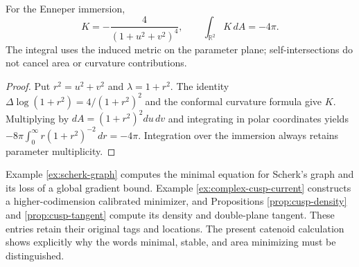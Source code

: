 \begin{proposition}\label{prop:enneper-total-curvature}
For the Enneper immersion,
\[
 K=-\frac4{(1+u^2+v^2)^4},\qquad
 \int_{\mathbb R^2}K\,dA=-4\pi.
\]
The integral uses the induced metric on the parameter plane; self-intersections do not cancel area or curvature contributions.
\end{proposition}
\begin{proof}
Put $r^2=u^2+v^2$ and $\lambda=1+r^2$. The identity $\Delta\log(1+r^2)=4/(1+r^2)^2$ and the conformal curvature formula give $K$. Multiplying by $dA=(1+r^2)^2du\,dv$ and integrating in polar coordinates yields $-8\pi\int_0^\infty r(1+r^2)^{-2}\,dr=-4\pi$. Integration over the immersion always retains parameter multiplicity.
\end{proof}

\begin{remark}\label{rem:example-minimal-links}
Example \ref{ex:scherk-graph} computes the minimal equation for Scherk's graph and its loss of a global gradient bound. Example \ref{ex:complex-cusp-current} constructs a higher-codimension calibrated minimizer, and Propositions \ref{prop:cusp-density} and \ref{prop:cusp-tangent} compute its density and double-plane tangent. These entries retain their original tags and locations. The present catenoid calculation shows explicitly why the words minimal, stable, and area minimizing must be distinguished.
\end{remark}
